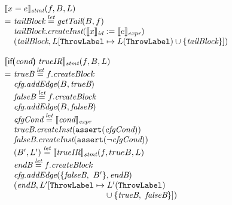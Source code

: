 \[\begin{array}{l@{}l@{~}l}
\lefteqn{\transfun{\ircfgexpr{x}{e}}_{\emph{stmt}}(f, B, L)}\\
& = & \emph{tailBlock} \letval \getTail(B, f)\\
& & \emph{tailBlock}.\emph{createInst}(\transfun{x}_{\emph{id}} := \transfun{e}_{\emph{expr}})\\
& & (\emph{tailBlock}, L[\ThrowLabel \mapsto L(\ThrowLabel) \cup \{ \emph{tailBlock} \}])\\
& & \\

\lefteqn{\transfun{\ircfgif{\emph{cond}}{\emph{trueIR}}}_{\emph{stmt}}(f, B, L)}\\
& = & \emph{trueB} \letval f.\emph{createBlock}\\
& & \emph{cfg}.\emph{addEdge}(B, \emph{trueB})\\
& & \emph{falseB} \letval f.\emph{createBlock}\\
& & \emph{cfg}.\emph{addEdge}(B, \emph{falseB})\\
& & \emph{cfgCond} \letval \transfun{\emph{cond}}_{\emph{expr}}\\
& & \emph{trueB}.\emph{createInst}(\TT{assert}(\emph{cfgCond}))\\
& & \emph{falseB}.\emph{createInst}(\TT{assert}(\neg \emph{cfgCond}))\\
& & (B', L') \letval \transfun{\emph{trueIR}}_{\emph{stmt}}(f, trueB, L)\\
& & \emph{endB} \letval f.\emph{createBlock}\\
& & \emph{cfg}.\emph{addEdge}(\{ \emph{falseB},\ B' \}, \emph{endB})\\
& & (\emph{endB}, L'[\ThrowLabel \mapsto L'(\ThrowLabel)\\
& & \phantom{(\emph{endB}, L'[\ThrowLabel \mapsto}
 \cup \{ \emph{trueB},\ \emph{falseB} \}])\\

\end{array}
\]

